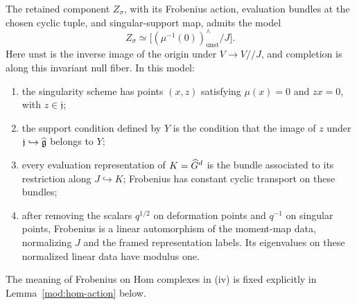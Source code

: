 \begin{theorem}
\label{mod:model}
\label{mod:quadratic-model}
The retained component $Z_\sigma$, with its Frobenius action,
evaluation bundles at the chosen cyclic tuple, and singular-support
map, admits the model
\begin{equation}
\label{mod:quadratic-equation}
 Z_\sigma\simeq
 \bigl[(\mu^{-1}(0))^{\wedge}_{\mathrm{unst}}/J\bigr].
\end{equation}
Here $\mathrm{unst}$ is the inverse image of the origin under
$V\to V/\!/J$, and completion is along this invariant null fiber.
In this model:
\begin{enumerate}[label=\textup{(\roman*)}]
\item the singularity scheme has points $(x,z)$ satisfying
      $\mu(x)=0$ and $zx=0$, with $z\in\mathfrak j$;
\item the support condition defined by $Y$ is the condition that the
      image of $z$ under $\mathfrak j\hookrightarrow\widehat{\mathfrak g}$ belongs
      to $Y$;
\item every evaluation representation of $K=\widehat G^d$ is the bundle
      associated to its restriction along $J\hookrightarrow K$;
      Frobenius has constant cyclic transport on these bundles;
\item after removing the scalars $q^{1/2}$ on deformation points and
      $q^{-1}$ on singular points, Frobenius is a linear
      automorphism of the moment-map data, normalizing $J$ and the
      framed representation labels. Its eigenvalues on these
      normalized linear data have modulus one.
\end{enumerate}
The meaning of Frobenius on Hom complexes in \textup{(iv)} is fixed
explicitly in Lemma~\ref{mod:hom-action} below.
\end{theorem}

